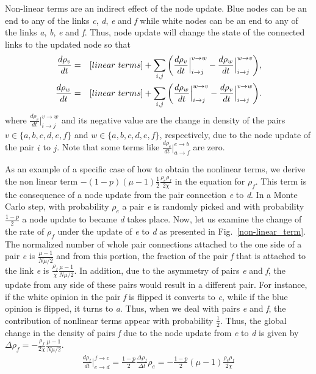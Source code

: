 \documentclass[aps,pre,notitlepage]{revtex4-1}
\begin{document}
Non-linear terms are an indirect effect of the node update. Blue nodes can be an end to any of the links \textit{c}, \textit{d}, \textit{e} and \textit{f} while white nodes can be an end to any of the links \textit{a}, \textit{b}, \textit{e} and \textit{f}. Thus, node update will change the state of the connected links to the updated node so that
\begin{eqnarray}
\frac{d\rho_{v}}{dt}&=&[linear \ terms]+\sum_{i,j}\bigg(\frac{d\rho_v}{dt}\Big\rvert_{i\to j}^{v\to w}-\frac{d\rho_w}{dt}\Big\rvert_{i\to j}^{w\to v}\bigg), \cr
\frac{d\rho_{w}}{dt}&=&[linear \ terms]+\sum_{i,j}\bigg(\frac{d\rho_w}{dt}\Big\rvert_{i\to j}^{w\to v}-\frac{d\rho_v}{dt}\Big\rvert_{i\to j}^{v\to w}\bigg).
\end{eqnarray}
where $\frac{d\rho_v}{dt}\Big\rvert_{i\to j}^{v\to w}$ and its negative value are the change in density of the pairs $v\in \{a,b,c,d,e,f\}$ and $w\in \{a,b,c,d,e,f\}$, respectively, due to the node update of the pair $i$ to $j$. Note that some terms like $\frac{d\rho_e}{dt}\Big\rvert_{a\to f}^{e\to b}$ are zero.

As an example of a specific case of how to obtain the nonlinear terms, we derive the non linear term $-(1-p)(\mu-1)\frac{1}{2}\frac{\rho_{e}\rho_{f}}{2\chi}$ in the equation for $\rho_{f}$. This term is the consequence of a node update from the pair connection \textit{e} to \textit{d}. In a Monte Carlo step, with probability $\rho_{e}$ a pair \textit{e} is randomly picked and with probability $\frac{1-p}{2}$ a node update to became \textit{d} takes place. Now, let us examine the change of the rate of $\rho_{f}$ under the update of \textit{e} to \textit{d} as presented in Fig.~\ref{non-linear_term}. The normalized number of whole pair connections attached to the one side of a pair \textit{e} is $\frac{\mu-1}{N\mu/2}$ and from this portion, the fraction of the pair \textit{f} that is attached to the link \textit{e} is $\frac{\rho_{f}}{\chi}\frac{\mu-1}{N\mu/2}$. In addition, due to the asymmetry of pairs \textit{e} and \textit{f}, the update from any side of these pairs would result in a different pair. For instance, if the white opinion in the pair \textit{f} is flipped it converts to \textit{c}, while if the blue opinion is flipped, it turns to \textit{a}. Thus, when we deal with pairs \textit{e} and \textit{f}, the contribution of nonlinear terms appear with probability $\frac{1}{2}$. Thus, the global change in the density of pairs \textit{f} due to the node update from \textit{e} to \textit{d} is given by $\Delta\rho_f=-\frac{\rho_{f}}{2\chi}\frac{\mu-1}{N\mu/2}$.
\begin{eqnarray}
\frac{d\rho_f}{dt}\Big\rvert_{e\to d}^{f\to c}=\frac{1-p}{2}\frac{\Delta\rho_f}{\Delta t}\rho_e =-\frac{1-p}{2}(\mu-1)\frac{\rho_{e}\rho_{f}}{2\chi}
\end{eqnarray}
\end{document}
